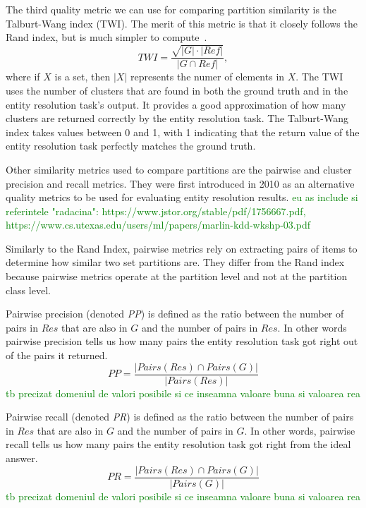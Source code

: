 \documentclass[journal]{IEEEtran}
\begin{document}
    The third quality metric we can use for comparing partition similarity is
    the Talburt-Wang index (TWI).
    The merit of this metric is that it closely follows the Rand index, but is
    much simpler to compute~\cite{Tal11}.
    \[
        TWI = \frac{\sqrt{|G|\cdot|Ref|}}{|G \cap Ref|},
    \]
    where if $X$ is a set, then $|X|$ represents the numer of elements in $X$. 
    The TWI uses the number of clusters that are found in both the ground
    truth and in the entity resolution task's output.
    It provides a good approximation of how many clusters are returned correctly
    by the entity resolution task.
    The Talburt-Wang index takes values between 0 and 1, with 1 indicating that
    the return value of the entity resolution task perfectly matches the ground
    truth.

    Other similarity metrics used to compare partitions are the pairwise and
    cluster precision and recall metrics.
    They were first introduced in 2010 as an alternative quality
    metrics to be used for evaluating entity resolution results\cite{Men10}. 
    \textcolor{green}{eu as include si referintele "radacina": https://www.jstor.org/stable/pdf/1756667.pdf, https://www.cs.utexas.edu/users/ml/papers/marlin-kdd-wkshp-03.pdf}

    Similarly to the Rand Index, pairwise metrics rely on extracting pairs of
    items to determine how similar two set partitions are.
    They differ from the Rand index because pairwise metrics operate at the
    partition level and not at the partition class level.
    
    Pairwise precision (denoted \textit{PP}) is defined as the ratio between the
    number of pairs in $Res$ that are also in $G$ and the number of pairs in
    $Res$.
    In other words pairwise precision tells us how many pairs the entity
    resolution task got right out of the pairs it returned.
    \[
        PP = \frac{|Pairs(Res) \cap Pairs(G)|}{|Pairs(Res)|}
    \]
    \textcolor{green}{tb precizat domeniul de valori posibile si ce inseamna valoare buna si valoarea rea}

    Pairwise recall (denoted \textit{PR}) is defined as the ratio between the
    number of pairs in $Res$ that are also in $G$ and the number of pairs in $G$.
    In other words, pairwise recall tells us how many pairs the entity
    resolution task got right from the ideal answer.
    \[
        PR = \frac{|Pairs(Res) \cap Pairs(G)|}{|Pairs(G)|}
    \]
    \textcolor{green}{tb precizat domeniul de valori posibile si ce inseamna valoare buna si valoarea rea}
\end{document}
